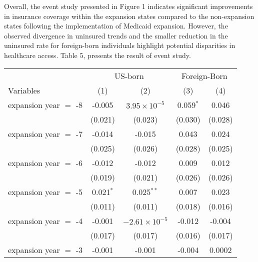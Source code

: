 \documentclass[
]{article}
\let\origtable\table
\let\endorigtable\endtable
\renewenvironment{table}[1][ht]{
      \expandafter\origtable\expandafter[H]
    }{
      \endorigtable
    }
\begin{document}
Overall, the event study presented in Figure 1 indicates significant
improvements in insurance coverage within the expansion states compared
to the non-expansion states following the implementation of Medicaid
expansion. However, the observed divergence in uninsured trends and the
smaller reduction in the uninsured rate for foreign-born individuals
highlight potential disparities in healthcare access. Table 5, presents
the result of event study.

\begin{table}[htbp]
   \caption{The Impact of Medicaid Expansion on Uninsured Rate }
   \centering
   \small
   \renewcommand*{\arraystretch}{0.5}
   \begin{tabular}{lcccc}
      \tabularnewline \midrule \midrule
       & \multicolumn{2}{c}{US-born} & \multicolumn{2}{c}{Foreign-Born} \\ \cmidrule(lr){2-3} \cmidrule(lr){4-5}
      Variables             & (1)            & (2)                    & (3)            & (4)\\  
      \midrule 
      expansion year $=$ -8 & -0.005         & $3.95\times 10^{-5}$   & 0.059$^{*}$    & 0.046\\   
                            & (0.021)        & (0.023)                & (0.030)        & (0.028)\\   
      expansion year $=$ -7 & -0.014         & -0.015                 & 0.043          & 0.024\\   
                            & (0.025)        & (0.026)                & (0.028)        & (0.025)\\   
      expansion year $=$ -6 & -0.012         & -0.012                 & 0.009          & 0.012\\   
                            & (0.019)        & (0.021)                & (0.026)        & (0.026)\\   
      expansion year $=$ -5 & 0.021$^{*}$    & 0.025$^{**}$           & 0.007          & 0.023\\   
                            & (0.011)        & (0.011)                & (0.018)        & (0.016)\\   
      expansion year $=$ -4 & -0.001         & $-2.61\times 10^{-5}$  & -0.012         & -0.004\\   
                            & (0.017)        & (0.017)                & (0.016)        & (0.017)\\   
      expansion year $=$ -3 & -0.001         & -0.001                 & -0.004         & 0.0002\\   

\end{tabular}
\end{table}
\end{document}
